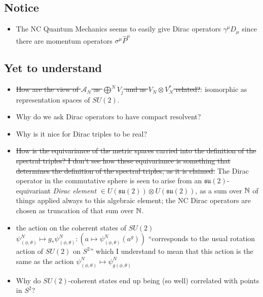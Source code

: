 \documentclass{article}
\newcommand{\sut}{\ensuremath{\mathfrak{su}(2)}}
\begin{document}
\subsection{Notice}

    \begin{itemize}

    \item The NC Quantum Mechanics seems to easily give Dirac operators $\gamma^\mu D_\mu$ since there are momentum operators $\sigma^\mu \hat P^\mu$
    
    \end{itemize}

\subsection{Yet to understand}

    \begin{itemize}

    \item \sout{How are the view of $\mathcal A_N$ as $\bigoplus^N V_j$ and as $V_{N} \otimes V_N^*$ related?}: isomorphic as representation spaces of $SU(2)$.
    
    \item Why do we ask Dirac operators to have compact resolvent?
    
    \item Why is it nice for Dirac triples to be real?
    
    \item \sout{How is the equivariance of the metric spaces carried into the definition of the spectral triples? I don't see how these equivariance is something that determines the definition of the spectral triples, as it is claimed.} The Dirac operator in the commutative sphere is seen to arise from an $\sut$-equivariant \textit{Dirac element} $\in U(\sut)\otimes U(\sut)$, as a sum over $\mathbb{N}$ of things applied always to this algebraic element; the NC Dirac operators are chosen as truncation of that sum over $\mathbb{N}$.
    
    \item {} the action on the coherent states of $SU(2)$ $\psi^N_{(\phi, \theta)} \mapsto g_*\psi^N_{(\phi, \theta)}:(a \mapsto \psi^N_{(\phi, \theta)}(a^g))$ ``corresponds to the usual rotation action of $SU(2)$ on $S^2$'' which I understand to mean that this action is the same as the action $\psi^N_{(\phi, \theta)} \mapsto \psi^N_{g(\phi, \theta)}$
    
    \item Why do $SU(2)$-coherent states end up being (so well) correlated with points in $S^2$?
    
    \end{itemize}
\end{document}
